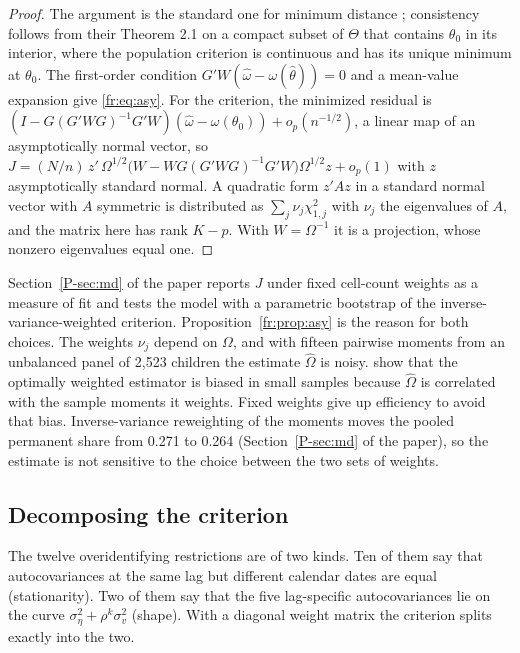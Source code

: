 \begin{proof}
The argument is the standard one for minimum distance \citep{NeweyMcFadden1994}; consistency follows from their Theorem 2.1 on a compact subset of $\Theta$ that contains $\theta_0$ in its interior, where the population criterion is continuous and has its unique minimum at $\theta_0$. The first-order condition
$G'W(\hat\omega - \omega(\hat\theta)) = 0$ and a mean-value expansion
give \eqref{fr:eq:asy}. For the criterion, the minimized residual is
$(I - G(G'WG)^{-1}G'W)(\hat\omega - \omega(\theta_0)) + o_p(n^{-1/2})$,
a linear map of an asymptotically normal vector, so
$J = (N/n)\,z'\,\Omega^{1/2}\big(W - WG(G'WG)^{-1}G'W\big)\Omega^{1/2}z + o_p(1)$
with $z$ asymptotically standard normal. A quadratic form $z'Az$ in a
standard normal vector with $A$ symmetric is distributed as
$\sum_j \nu_j\chi^2_{1,j}$ with $\nu_j$ the eigenvalues of $A$,
and the matrix here has rank $K - p$. With $W = \Omega^{-1}$ it is a
projection, whose nonzero eigenvalues equal one.
\end{proof}

Section~\ref{P-sec:md} of the paper reports $J$ under fixed cell-count
weights as a measure of fit and tests the model with a parametric
bootstrap of the inverse-variance-weighted criterion. Proposition~\ref{fr:prop:asy} is the reason for both choices. The
weights $\nu_j$ depend on $\Omega$, and with fifteen pairwise moments
from an unbalanced panel of 2,523 children the estimate $\hat\Omega$ is
noisy. \citet{AltonjiSegal1996} show that the optimally weighted
estimator is biased in small samples because $\hat\Omega$ is correlated
with the sample moments it weights. Fixed weights give up efficiency to
avoid that bias. Inverse-variance reweighting of the
moments moves the pooled permanent share from 0.271 to 0.264 (Section~\ref{P-sec:md} of the paper), so the estimate is not
sensitive to the choice between the two sets of weights.

\subsection{Decomposing the criterion}

The twelve overidentifying restrictions are of two kinds. Ten of them
say that autocovariances at the same lag but different calendar dates
are equal (stationarity). Two of them say that the five lag-specific
autocovariances lie on the curve $\sigma^2_\eta + \rho^k\sigma^2_v$
(shape). With a diagonal weight matrix the criterion splits exactly
into the two.

